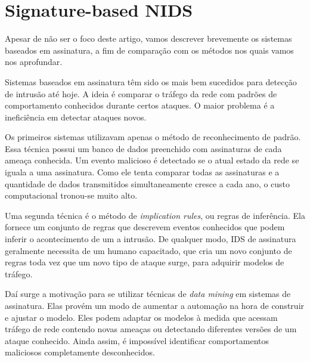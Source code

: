 \chapter{Signature-based NIDS}
\label{ch:snids}
Apesar de não ser o foco deste artigo, vamos descrever brevemente os sistemas baseados em assinatura, a fim de
comparação com os métodos nos quais vamos nos aprofundar.
\par Sistemas baseados em assinatura têm sido os mais bem sucedidos para detecção de intrusão até hoje.
A ideia é comparar o tráfego da rede com padrões de comportamento conhecidos durante certos ataques.
O maior problema é a ineficiência em detectar ataques novos.
\par Os primeiros sistemas utilizavam apenas o método de reconhecimento de padrão. Essa técnica possui um banco de dados
 preenchido com assinaturas de cada ameaça conhecida. Um evento malicioso é detectado se o atual estado da rede se iguala
 a uma assinatura. Como ele tenta comparar todas as assinaturas e a quantidade de dados transmitidos simultaneamente
cresce a cada ano, o custo computacional tronou-se muito alto.
\par Uma segunda técnica é o método de \textit{implication rules}, ou regras de inferência. Ela fornece um conjunto de
regras que descrevem eventos conhecidos que podem inferir o acontecimento de um a intrusão. De qualquer modo, IDS de
assinatura geralmente necessita de um humano capacitado, que cria um novo conjunto de regras toda vez que um novo
tipo de ataque surge, para adquirir modelos de tráfego.
\par Daí surge a motivação para se utilizar técnicas de \textit{data mining} em sistemas de assinatura. Elas provém um
 modo de aumentar a automação na hora de construir e ajustar o modelo. Eles podem adaptar os modelos à medida que
 acessam tráfego de rede contendo novas ameaças ou detectando diferentes versões de um ataque conhecido. Ainda assim,
 é impossível identificar comportamentos maliciosos completamente desconhecidos.